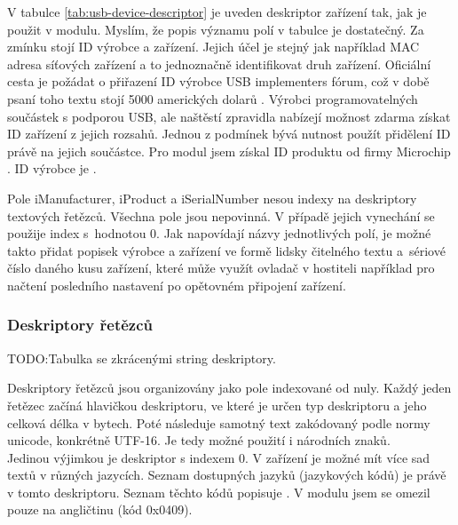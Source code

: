 V tabulce \ref{tab:usb-device-descriptor} je uveden deskriptor zařízení tak, jak je použit v modulu. Myslím, že popis významu  polí v tabulce je dostatečný.  Za zmínku stojí ID výrobce a zařízení. Jejich účel je stejný jak například MAC adresa síťových zařízení a to jednoznačně identifikovat druh zařízení. Oficiální cesta je požádat o přiřazení ID výrobce USB implementers fórum, což v době psaní toho textu stojí 5000 amerických dolarů \cite{usb-vid}. Výrobci programovatelných součástek s podporou USB, ale naštěstí zpravidla nabízejí možnost zdarma získat ID zařízení z jejich rozsahů. Jednou z podmínek bývá nutnost použít přidělení ID  právě na jejich součástce. Pro modul jsem získal ID produktu od firmy Microchip \PID. ID výrobce je \VID.

Pole iManufacturer, iProduct a iSerialNumber nesou indexy na deskriptory textových řetězců. Všechna pole jsou nepovinná. V případě jejich vynechání se použije index s~hodnotou 0. Jak napovídají názvy jednotlivých polí, je možné takto přidat popisek výrobce a zařízení ve formě lidsky čitelného textu a~sériové číslo daného kusu zařízení, které může využít ovladač v hostiteli například pro načtení posledního nastavení po opětovném připojení zařízení.

\subsubsection{Deskriptory řetězců}
TODO:Tabulka se zkrácenými string deskriptory.

Deskriptory řetězců jsou organizovány jako pole indexované od nuly. Každý jeden řetězec začíná hlavičkou deskriptoru, ve které je určen typ deskriptoru a jeho celková délka v bytech. Poté následuje samotný text zakódovaný podle normy unicode, konkrétně UTF-16. Je tedy možné použití i národních znaků.\\
Jedinou výjimkou je deskriptor s indexem 0. V zařízení je možné mít více sad textů v různých jazycích. Seznam dostupných jazyků (jazykových kódů) je právě v tomto deskriptoru. Seznam těchto kódů popisuje \cite{usb-lang}. V modulu jsem se omezil pouze na angličtinu (kód 0x0409).

